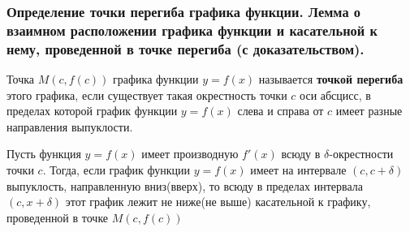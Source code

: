 \documentclass[10pt]{article}
\begin{document}



    \subsubsection{Определение точки перегиба графика функции. Лемма о взаимном расположении графика функции и касательной к нему, проведенной в точке перегиба (с доказательством).}
    \begin{definition}
        Точка $M(c, f(c))$ графика функции $y = f(x)$ называется \textbf{точкой перегиба} этого графика, если существует такая окрестность точки $c$ оси абсцисс, в пределах которой график функции $y = f(x)$ слева и справа от $c$ имеет разные направления выпуклости.
    \end{definition}
    \begin{lemma}
        Пусть функция $y = f(x)$ имеет производную $f'(x)$ всюду в $\delta$-окрестности точки $c$. Тогда, если график функции $y = f(x)$ имеет на интервале $(c, c+\delta)$ выпуклость, направленную вниз(вверх), то всюду в пределах интервала $(c, x+\delta)$ этот график лежит не ниже(не выше) касательной к графику, проведенной в точке $M(c, f(c))$
    \end{lemma}
\end{document}
